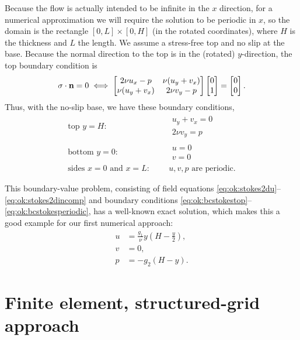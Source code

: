 Because the flow is actually intended to be infinite in the $x$ direction, for a numerical approximation we will require the solution to be periodic in $x$, so the domain is the rectangle $[0,L]\times[0,H]$ (in the rotated coordinates), where $H$ is the thickness and $L$ the length.  We assume a stress-free top and no slip at the base.  Because the normal direction to the top is in the (rotated) $y$-direction, the top boundary condition is
  $$\sigma\cdot\mathbf{n} = 0 \iff
\begin{bmatrix}
2 \nu u_x - p & \nu (u_y+v_x) \\
\nu (u_y+v_x) & 2 \nu v_y - p
\end{bmatrix} \begin{bmatrix}
0 \\ 1
\end{bmatrix} = \begin{bmatrix}
0 \\ 0
\end{bmatrix}.$$
Thus, with the no-slip base, we have these boundary conditions,
\begin{align}
\text{top $y=H$:}&    & &\begin{array}{l} u_y + v_x = 0 \\ 2 \nu v_y = p\end{array}  \label{eq:ok:bcstokestop} \\
\text{bottom $y=0$:}& & &\begin{array}{l} u = 0 \\ v = 0 \end{array} \label{eq:ok:bcstokesbottom} \\
\text{sides $x=0$ and $x=L$:}&
                      & &u,v,p \text{ are periodic}. \label{eq:ok:bcstokesperiodic}
\end{align}

This boundary-value problem, consisting of field equations \eqref{eq:ok:stokes2du}--\eqref{eq:ok:stokes2dincomp} and boundary conditions \eqref{eq:ok:bcstokestop}--\eqref{eq:ok:bcstokesperiodic}, has a well-known exact solution, which makes this a good example for our first numerical approach:
\begin{align}
u &= \frac{g_1}{\nu} y \left(H - \frac{y}{2}\right), \label{eq:ok:exactstokesu} \\
v &= 0, \label{eq:ok:exactstokesv} \\
p &= -g_2 (H-y).\label{eq:ok:exactstokesp}
\end{align}



\section{Finite element, structured-grid approach}

